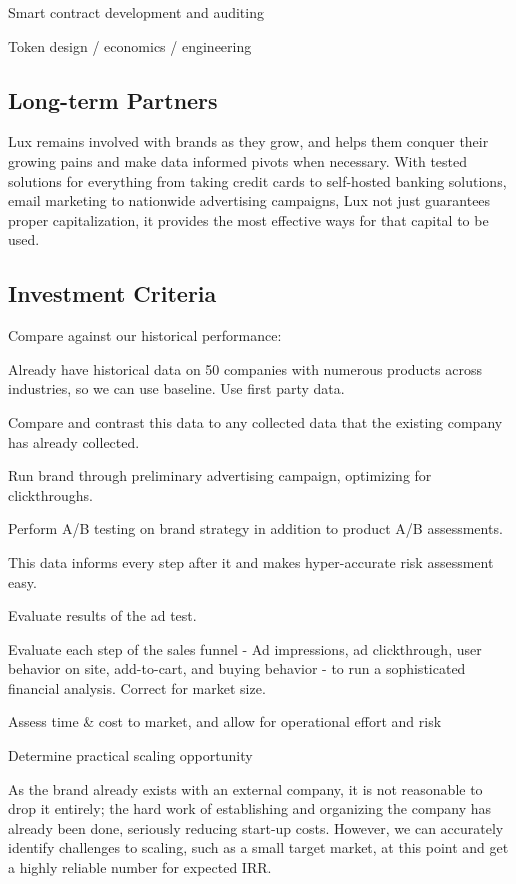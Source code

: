 \documentclass[11pt]{article}
\begin{document}
Smart contract development and auditing


Token design / economics / engineering


\subsection{Long-term Partners}

Lux remains involved with brands as they grow, and helps them conquer their growing pains and make data informed pivots when necessary. With tested solutions for everything from taking credit cards to self-hosted banking solutions, email marketing to nationwide advertising campaigns, Lux not just guarantees proper capitalization, it provides the most effective ways for that capital to be used.


\subsection{Investment Criteria}

Compare against our historical performance:


Already have historical data on 50 companies with numerous products across industries, so we can use baseline. Use first party data.


Compare and contrast this data to any collected data that the existing company has already collected.


Run brand through preliminary advertising campaign, optimizing for clickthroughs.


Perform A/B testing on brand strategy in addition to product A/B assessments.


This data informs every step after it and makes hyper-accurate risk assessment easy.


Evaluate results of the ad test.


Evaluate each step of the sales funnel - Ad impressions, ad clickthrough, user behavior on site, add-to-cart, and buying behavior - to run a sophisticated financial analysis. Correct for market size.


Assess time \& cost to market, and allow for operational effort and risk


Determine practical scaling opportunity


As the brand already exists with an external company, it is not reasonable to drop it entirely; the hard work of establishing and organizing the company has already been done, seriously reducing start-up costs. However, we can accurately identify challenges to scaling, such as a small target market, at this point and get a highly reliable number for expected IRR.
\end{document}

